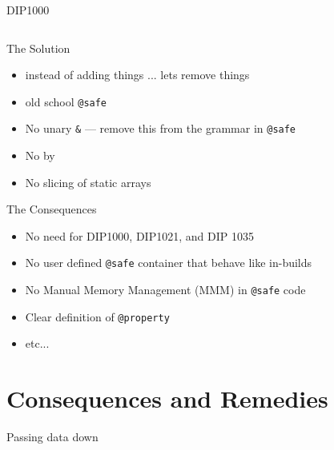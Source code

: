 \documentclass[aspectratio=169,notes]{beamer}
\begin{document}
	\begin{frame}[fragile]{DIP1000}
		\begin{columns}[T]
		\begin{column}{0.49\textwidth}
		
		\end{column}
		\begin{column}{0.49\textwidth}
		
		\end{column}
		\end{columns}
	\end{frame}

	\begin{frame}[fragile]{The Solution}
		\begin{itemize}
			\item instead of adding things ... lets remove things\vspace{1cm}
			\pause
			\item old school \lstinline|@safe|
			\item No unary \lstinline|&| --- remove this from the grammar in \lstinline|@safe|
			\item No \lstinline@return@ by \lstinline@ref@
			\item No slicing of static arrays
		\end{itemize}
	\end{frame}

	\begin{frame}[fragile]{The Consequences}
		\begin{itemize}
			\item No need for DIP1000, DIP1021, and DIP 1035
			\item No user defined \lstinline|@safe| container that behave like in-builds
			\item No Manual Memory Management (MMM) in \lstinline|@safe| code
			\item Clear definition of \lstinline|@property|
			\item etc...
		\end{itemize}
	\end{frame}

	\section{Consequences and Remedies}

	\begin{frame}[fragile]{Passing data down}
		\begin{columns}[T]
		\begin{column}{0.49\textwidth}
		
		\end{column}
		\pause
		\begin{column}{0.49\textwidth}
		
		\end{column}
		\end{columns}
	\end{frame}
\end{document}
